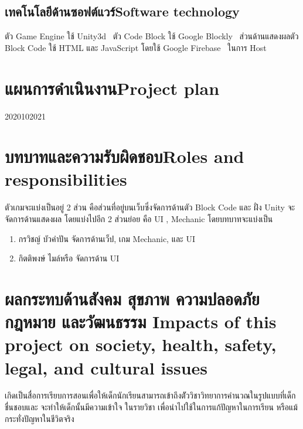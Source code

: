 \subsection{\ifcpe เทคโนโลยีด้านซอฟต์แวร์\else Software technology\fi}
ตัว Game Engine ใช้ Unity3d~\cite{utb,ud} ตัว Code Block ใช้ Google Blockly~\cite{gb}
ส่วนด้านแสดงผลตัว Block Code ใช้ HTML และ JavaScript โดยใช้ Google Firebase~\cite{fb} ในการ Host

\section{\ifcpe แผนการดำเนินงาน\else Project plan\fi}
\begin{plan}{11}{2020}{10}{2021}
\end{plan}

\section{\ifcpe บทบาทและความรับผิดชอบ\else Roles and responsibilities\fi}
ตัวเกมจะแบ่งเป็นอยู่ 2 ส่วน คือส่วนที่อยู่บนเว็บซึ่งจัดการด้านตัว Block Code และ ฝั่ง Unity จะจัดการด้านแสดงผล โดยแบ่งไปอีก
2 ส่วนย่อย คือ UI , Mechanic โดยบทบาทจะแบ่งเป็น
\begin{enumerate}
    \item กรวิชญ์ บัวคำปัน จัดการด้านเว็ป, เกม Mechanic, และ UI
    \item กิตติพงษ์ ไมล์หรือ จัดการด้าน UI
\end{enumerate}

\section{\ifcpe%
ผลกระทบด้านสังคม สุขภาพ ความปลอดภัย กฎหมาย และวัฒนธรรม
\else%
Impacts of this project on society, health, safety, legal, and cultural issues
\fi}

เกิดเป็นสื่อการเรียบการสอนเพื่อให้เด็กนักเรียนสามารถเข้าถึงตััววิชาวิทยาการคำนวณในรูปแบบที่เด็กชื่นชอบและ จะทำให้เด็กนั้นมีความเข้าใจ
ในรายวิชา เพื่อนำไปใช้ในการแก้ปัญหาในการเรียน หรือแม้กระทั่งปัญหาในชีวิตจริง